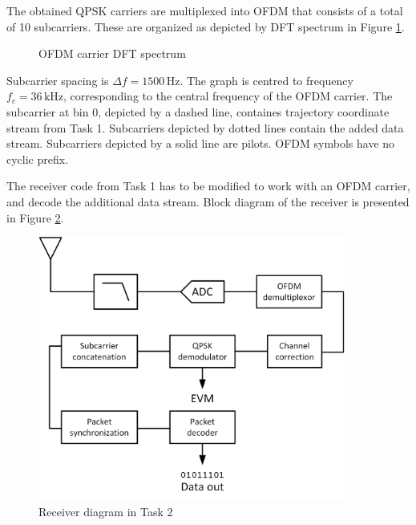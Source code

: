 \documentclass{article}
\begin{document}
The obtained QPSK carriers are multiplexed into OFDM that consists of a total of 10 subcarriers. These are organized as depicted by DFT spectrum in Figure \ref{fig:dft}.
\begin{figure}[h!]
	\centering
	\caption{OFDM carrier DFT spectrum}
	\label{fig:dft}
\end{figure}

Subcarrier spacing is $\varDelta f = 1500 \,\textrm{Hz}$. The graph is centred to frequency $f_c = 36 \,\textrm{kHz}$, corresponding to the central frequency of the OFDM carrier. The subcarrier at bin 0, depicted by a dashed line, containes trajectory coordinate stream from Task 1. Subcarriers depicted by dotted lines contain the added data stream. Subcarriers depicted by a solid line are pilots. OFDM symbols have no cyclic prefix.

The receiver code from Task 1 has to be modified to work with an OFDM carrier, and decode the additional data stream. Block diagram of the receiver is presented in Figure \ref{fig:task2}.

\begin{figure}[h!]
\centering
\includegraphics[width=0.9\textwidth]{Images/Task2.png}
\caption{Receiver diagram in Task 2}
\label{fig:task2}
\end{figure}
\end{document}
